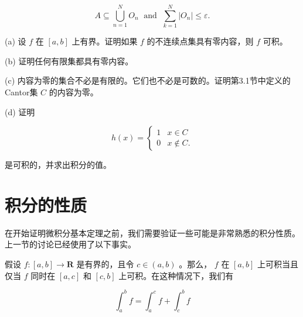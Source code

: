 \[
A \subseteq  \mathop{\bigcup }\limits_{{n = 1}}^{N}{O}_{n}\;\text{ and }\;\mathop{\sum }\limits_{{k = 1}}^{N}\left| {O}_{n}\right|  \leq  \varepsilon .
\]

(a) 设 \(f\) 在 \(\left\lbrack  {a,b}\right\rbrack\) 上有界。证明如果 \(f\) 的不连续点集具有零内容，则 \(f\) 可积。

(b) 证明任何有限集都具有零内容。

(c) 内容为零的集合不必是有限的。它们也不必是可数的。证明第3.1节中定义的Cantor集 \(C\) 的内容为零。

(d) 证明

\[
h\left( x\right)  = \left\{  \begin{array}{ll} 1 & x \in  C \\  0 & x \notin  C. \end{array}\right.
\]

是可积的，并求出积分的值。

\section{积分的性质}
\label{sec:7.4}
在开始证明微积分基本定理之前，我们需要验证一些可能是非常熟悉的积分性质。上一节的讨论已经使用了以下事实。


\begin{Thm}\label{thm:7.4.1}
假设 \(f : \left\lbrack  {a,b}\right\rbrack   \rightarrow  \mathbf{R}\) 是有界的，且令 \(c \in  \left( {a,b}\right)\) 。那么， \(f\) 在 \(\left\lbrack  {a,b}\right\rbrack\) 上可积当且仅当 \(f\) 同时在 \(\left\lbrack  {a,c}\right\rbrack\) 和  \(\left\lbrack  {c,b}\right\rbrack\) 上可积。在这种情况下，我们有

\[
{\int }_{a}^{b}f = {\int }_{a}^{c}f + {\int }_{c}^{b}f
\]
\end{Thm}


